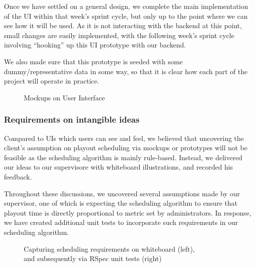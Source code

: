 ﻿\documentclass[a4paper, titlepage]{article}
\begin{document}
Once we have settled on a general design, we complete the main implementation of the UI within that week's sprint cycle, but only up to the point where we can see how it will be used. As it is not interacting with the backend at this point, small changes are easily implemented, with the following week's sprint cycle involving ``hooking'' up this UI prototype with our backend.

We also made sure that this prototype is seeded with some dummy/representative data in some way, so that it is clear how each part of the project will operate in practice.

\begin{figure}[H]
   \begin{center}
   \end{center}
   \caption{Mockups on User Interface}
   \label{fig:mockup}
\end{figure}

\subsubsection{Requirements on intangible ideas}

Compared to UIs which users can see and feel, we believed that uncovering the client's assumption on playout scheduling via mockups or prototypes will not be feasible as the scheduling algorithm is mainly rule-based. Instead, we delivered our ideas to our supervisore with whiteboard illustrations, and recorded his feedback.

Throughout these discussions, we uncovered several assumptions made by our supervisor, one of which is expecting the scheduling algorithm to ensure that playout time is directly proportional to metric set by administrators. In response, we have created additional unit tests to incorporate such requirements in our scheduling algorithm.

\begin{figure}[H]
  \begin{minipage}{0.46\textwidth}
  \end{minipage}
  \begin{minipage}{0.53\textwidth}
  \end{minipage}
  \caption{Capturing scheduling requirements on whiteboard (left), \\ and subsequently via RSpec unit tests (right)}
 
\end{figure}
\end{document}
